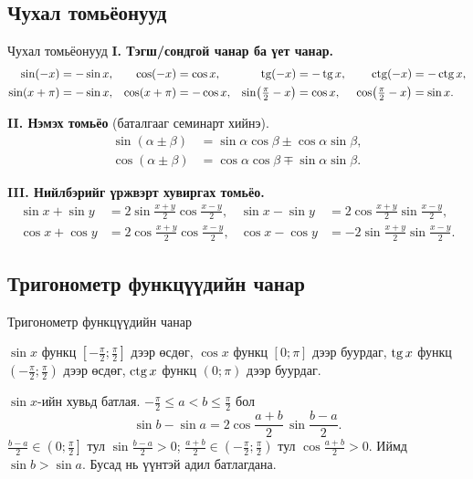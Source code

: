 \subsection{Чухал томьёонууд}
\begin{frame}[allowframebreaks]{Чухал томьёонууд}
\textbf{I. Тэгш/сондгой чанар ба үет чанар.}
\begin{align*}
\sin(-x)&=-\sin x, & \cos(-x)&=\cos x, & \operatorname{tg}(-x)&=-\operatorname{tg} x, & \operatorname{ctg}(-x)&=-\operatorname{ctg} x,\\
\sin(x+\pi)&=-\sin x, & \cos(x+\pi)&=-\cos x, &
\sin\!\left(\tfrac{\pi}{2}-x\right)&=\cos x, & \cos\!\left(\tfrac{\pi}{2}-x\right)&=\sin x.
\end{align*}

\textbf{II. Нэмэх томьёо} (баталгааг семинарт хийнэ).
\begin{align*}
\sin(\alpha\pm\beta)&=\sin\alpha\cos\beta\pm\cos\alpha\sin\beta,\\
\cos(\alpha\pm\beta)&=\cos\alpha\cos\beta\mp\sin\alpha\sin\beta.
\end{align*}

\textbf{III. Нийлбэрийг үржвэрт хувиргах томьёо.}
\begin{align*}
\sin x+\sin y&=2\sin\frac{x+y}{2}\cos\frac{x-y}{2}, &
\sin x-\sin y&=2\cos\frac{x+y}{2}\sin\frac{x-y}{2},\\
\cos x+\cos y&=2\cos\frac{x+y}{2}\cos\frac{x-y}{2}, &
\cos x-\cos y&=-2\sin\frac{x+y}{2}\sin\frac{x-y}{2}.
\end{align*}
\end{frame}

\subsection{Тригонометр функцүүдийн чанар}
\begin{frame}[allowframebreaks]{Тригонометр функцүүдийн чанар}
\begin{theorem}
$\sin x$ функц $\left[-\frac{\pi}{2};\frac{\pi}{2}\right]$ дээр өсдөг,
$\cos x$ функц $[0;\pi]$ дээр буурдаг,
$\operatorname{tg} x$ функц $\left(-\frac{\pi}{2};\frac{\pi}{2}\right)$ дээр өсдөг,
$\operatorname{ctg} x$ функц $(0;\pi)$ дээр буурдаг.
\end{theorem}
\begin{prof}
$\sin x$-ийн хувьд батлая. $-\frac{\pi}{2}\le a<b\le\frac{\pi}{2}$ бол
\[
\sin b-\sin a=2\cos\frac{a+b}{2}\,\sin\frac{b-a}{2}.
\]
$\frac{b-a}{2}\in\left(0;\frac{\pi}{2}\right]$ тул $\sin\frac{b-a}{2}>0$;
$\frac{a+b}{2}\in\left(-\frac{\pi}{2};\frac{\pi}{2}\right)$ тул $\cos\frac{a+b}{2}>0$.
Иймд $\sin b>\sin a$. Бусад нь үүнтэй адил батлагдана.
\end{prof}
\end{frame}

